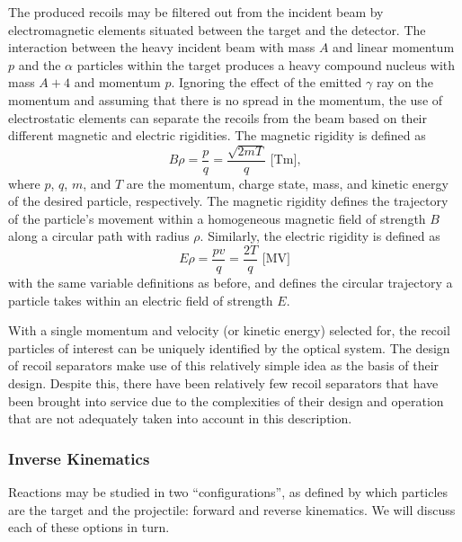 The produced recoils may be filtered out from the incident beam by
electromagnetic elements situated between the target and the detector. The
interaction between the heavy incident beam with mass $A$ and linear momentum
$p$ and the $\alpha$ particles within
the target produces a heavy compound nucleus with mass $A + 4$ and momentum
$p$. Ignoring the effect of the emitted $\gamma$ ray on the momentum and
assuming that there is no spread in the momentum, the use of electrostatic
elements can separate the recoils from the beam based on their different
magnetic and electric rigidities. The magnetic rigidity is defined as
\begin{equation}
    \label{eq:brho}
    B\rho = \frac{p}{q} = \frac{\sqrt{2mT}}{q}\textrm{ [Tm],}
\end{equation}
where $p$, $q$, $m$, and $T$ are the momentum, charge state, mass, and kinetic
energy of the desired particle, respectively. The magnetic rigidity
defines the trajectory of the particle's movement within a homogeneous magnetic
field of strength $B$ along a circular path with radius $\rho$. Similarly, the
electric rigidity is defined as
\begin{equation}
    \label{eq:erho}
    E\rho = \frac{pv}{q} = \frac{2T}{q}\textrm{ [MV]}
\end{equation}
with the same variable definitions as before, and defines the circular
trajectory a particle takes within an electric field of strength $E$.

With a single momentum and
velocity (or kinetic energy) selected for, the recoil particles of interest can
be uniquely identified by the optical system. The design of recoil separators
make use of this relatively simple idea as the basis of their design. Despite
this, there have been relatively few recoil separators that have been brought
into service due to the complexities of their design and operation that are not
adequately taken into account in this description.

\subsubsection{Inverse Kinematics}
Reactions may be studied in two ``configurations'', as defined by which
particles are the target and the projectile: forward and reverse
kinematics. We will discuss each of these options in turn.

